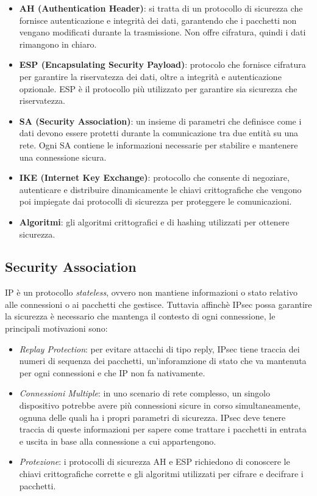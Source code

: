 \begin{itemize}
    \item \textbf{AH (Authentication Header)}: si tratta di un protocollo di sicurezza che fornisce autenticazione e integrità dei dati,
    garantendo che i pacchetti non vengano modificati durante la trasmissione. Non offre cifratura, quindi i dati rimangono in chiaro. 
    \item \textbf{ESP (Encapsulating Security Payload)}: protocolo che fornisce cifratura per garantire la riservatezza dei dati,
    oltre a integrità e autenticazione opzionale. ESP è il protocollo più utilizzato
    per garantire sia sicurezza che riservatezza.
    
    \item \textbf{SA (Security Association)}: un insieme di parametri che definisce come i dati devono essere protetti durante la comunicazione tra due entità su una rete. Ogni SA contiene le informazioni necessarie per stabilire e mantenere una connessione sicura.
    \item \textbf{IKE (Internet Key Exchange)}: protocollo che consente di negoziare, autenticare e distribuire dinamicamente le chiavi crittografiche che vengono poi impiegate dai protocolli di sicurezza per proteggere le comunicazioni.
    \item \textbf{Algoritmi}: gli algoritmi crittografici e di hashing utilizzati per ottenere sicurezza.
\end{itemize}


\subsection{Security Association}

IP è un protocollo \textit{stateless}, ovvero non mantiene informazioni o stato relativo alle connessioni o ai pacchetti che gestisce.
Tuttavia affinchè IPsec possa garantire la sicurezza è necessario che mantenga il contesto di ogni connessione, le principali motivazioni sono:
\begin{itemize}
    \item \textit{Replay Protection}: per evitare attacchi di tipo reply, IPsec tiene  traccia
    dei numeri di sequenza dei pacchetti, un'inforamzione di stato che va mantenuta per ogni connessioni
    e che IP non fa nativamente.
    \item \textit{Connessioni Multiple}: in uno scenario di rete complesso, un singolo dispositivo potrebbe avere più connessioni sicure in corso simultanea\-mente, ognuna
    delle quali ha i propri parametri di sicurezza. IPsec deve tenere traccia di queste informazioni per sapere come trattare i pacchetti in entrata e uscita in base alla connessione a cui appartengono.
    \item \textit{Protezione}: i protocolli di sicurezza AH e ESP richiedono di conoscere le chiavi crittografiche corrette e gli algoritmi utilizzati per cifrare e decifrare i pacchetti.
\end{itemize}

